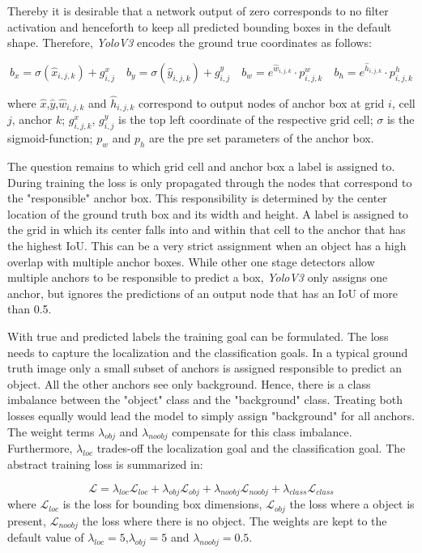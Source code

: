 Thereby it is desirable that a network output of zero corresponds to no filter activation and henceforth to keep all predicted bounding boxes in the default shape. Therefore, \textit{YoloV3} encodes the ground true coordinates as follows:

\begin{equation}
\label{sec:encoding}
b_x = \sigma(\hat x_{i,j,k}) + g^x_{i,j}\quad
b_y = \sigma(\hat y_{i,j,k}) + g^y_{i,j}\quad
b_w = e^{\hat w_{i,j,k}} \cdot p^w_{i,j,k}\quad
b_h = e^{\hat h_{i,j,k}} \cdot p^h_{i,j,k}
\end{equation}

where $\hat{x}$,$\hat{y}$,$\hat w_{i,j,k}$ and $\hat h_{i,j,k}$ correspond to output nodes of anchor box at grid $i$, cell $j$, anchor $k$; $g^x_{i,j,k}$, $g^y_{i,j}$ is the top left coordinate of the respective grid cell; $\sigma$ is the sigmoid-function; $p_w$ and $p_h$ are the pre set parameters of the anchor box.

The question remains to which grid cell and anchor box a label is assigned to. During training the loss is only propagated through the nodes that correspond to the "responsible" anchor box. This responsibility is determined by the center location of the ground truth box and its width and height. A label is assigned to the grid in which its center falls into and within that cell to the anchor that has the highest \ac{IoU}. This can be a very strict assignment when an object has a high overlap with multiple anchor boxes. While other one stage detectors allow multiple anchors to be responsible to predict a box, \textit{YoloV3} only assigns one anchor, but ignores the predictions of an output node that has an \ac{IoU} of more than 0.5.

With true and predicted labels the training goal can be formulated. The loss needs to capture the localization and the classification goals. In a typical ground truth image only a small subset of anchors is assigned responsible to predict an object. All the other anchors see only background. Hence, there is a class imbalance between the "object" class and the "background" class. Treating both losses equally would lead the model to simply assign "background" for all anchors. The weight terms $\lambda_{obj}$ and $\lambda_{noobj}$ compensate for this class imbalance. Furthermore, $\lambda_{loc}$ trades-off the localization goal and the classification goal. The abstract training loss is summarized in: 

\begin{equation}
\mathcal{L} = \lambda_{loc}\mathcal{L}_{loc} + \lambda_{obj}\mathcal{L}_{obj} + \lambda_{noobj}\mathcal{L}_{noobj} + \lambda_{class}\mathcal{L}_{class}
\end{equation}
where $\mathcal{L}_{loc}$ is the loss for bounding box dimensions, $\mathcal{L}_{obj}$ the loss where a object is present, $\mathcal{L}_{noobj}$ the loss where there is no object. The weights are kept to the default value of $\lambda_{loc} = 5$,$\lambda_{obj} = 5$ and $\lambda_{noobj} = 0.5$.

